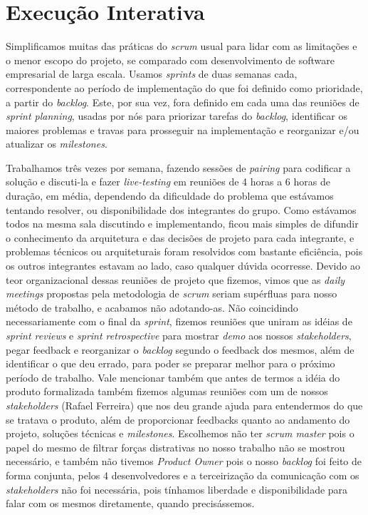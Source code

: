 \documentclass[twosideprint]{politex}
\begin{document}
\section{Execução Interativa}
Simplificamos muitas das práticas do \textit{scrum} usual para lidar com as limitações e o menor escopo do projeto, se comparado com desenvolvimento de software empresarial de larga escala.
Usamos \textit{sprints} de duas semanas cada, correspondente ao período de implementação do que foi definido como prioridade, a partir do \textit{backlog}. Este, por sua vez, fora definido em cada uma das reuniões de \textit{sprint planning}, usadas por nós para priorizar tarefas do \textit{backlog}, identificar os maiores problemas e travas para prosseguir na implementação e reorganizar e/ou atualizar os \textit{milestones}.\par
Trabalhamos três vezes por semana, fazendo sessões de \textit{pairing} para codificar a solução e discuti-la e fazer \textit{live-testing} em reuniões de 4 horas a 6 horas de duração, em média, dependendo da dificuldade do problema que estávamos tentando resolver, ou disponibilidade dos integrantes do grupo.
Como estávamos todos na mesma sala discutindo e implementando, ficou mais simples de difundir o conhecimento da arquitetura e das decisões de projeto para cada integrante, e problemas técnicos ou arquiteturais foram resolvidos com bastante eficiência, pois os outros integrantes estavam ao lado, caso qualquer dúvida ocorresse. Devido ao teor organizacional dessas reuniões de projeto que fizemos, vimos que as \textit{daily meetings} propostas pela metodologia de \textit{scrum} seriam supérfluas para nosso método de trabalho, e acabamos não adotando-as.
Não coincidindo necessariamente com o final da \textit{sprint}, fizemos reuniões que uniram as idéias de \textit{sprint reviews} e \textit{sprint retrospective} para mostrar \textit{demo} aos nossos \textit{stakeholders}, pegar feedback e reorganizar o \textit{backlog} segundo o feedback dos mesmos, além de identificar o que deu errado, para poder se preparar melhor para o próximo período de trabalho. 
Vale mencionar também que antes de termos a idéia do produto formalizada também fizemos algumas reuniões com um de nossos \textit{stakeholders} (Rafael Ferreira) que nos deu grande ajuda para entendermos do que se tratava o produto, além de proporcionar feedbacks quanto ao andamento do projeto, soluções técnicas e \textit{milestones}.
Escolhemos não ter \textit{scrum master} pois o papel do mesmo de filtrar forças distrativas no nosso trabalho não se mostrou necessário, e também não tivemos \textit{Product Owner} pois o nosso \textit{backlog} foi feito de forma conjunta, pelos 4 desenvolvedores e a terceirização da comunicação com os \textit{stakeholders} não foi necessária, pois tínhamos liberdade e disponibilidade para falar com os mesmos diretamente, quando precisássemos.
\end{document}
